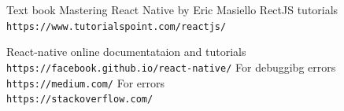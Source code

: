 \newpage
\begin{thebibliography}{9}
Text book
Mastering React Native by Eric Masiello 
RectJS tutorials
\\\texttt{https://www.tutorialspoint.com/reactjs/}

React-native online documentataion and tutorials
\\\texttt{https://facebook.github.io/react-native/}
For debuggibg errors
\\\texttt{https://medium.com/}
For errors
\\\texttt{https://stackoverflow.com/}

\end{thebibliography}













